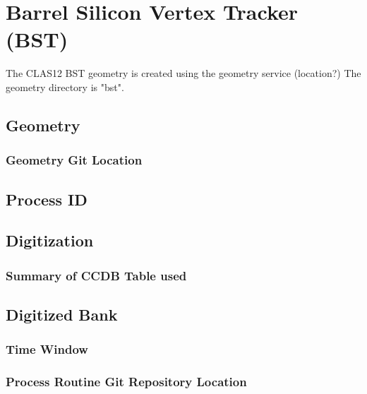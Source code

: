 \section{Barrel Silicon Vertex Tracker (BST)}

The CLAS12 BST geometry is created using the geometry service (location?)
The geometry directory is "bst".


\subsection{Geometry}

\subsubsection{Geometry Git Location}

\subsection{Process ID}

\subsection{Digitization}

\subsubsection{Summary of CCDB Table used}

\subsection{Digitized Bank}

\subsubsection{Time Window}

\subsubsection{Process Routine Git Repository Location}


